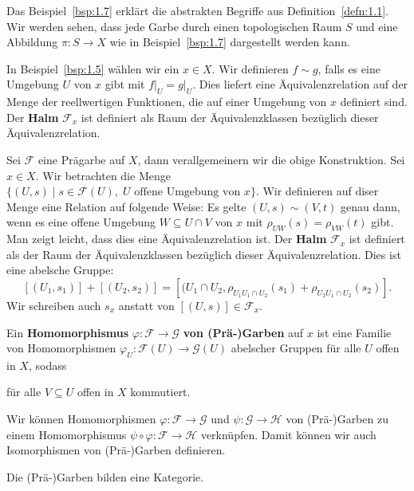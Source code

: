 \begin{bem}
	Das Beispiel~\ref{bsp:1.7} erklärt die abstrakten Begriffe aus Definition~\ref{defn:1.1}. Wir werden sehen, dass jede Garbe durch einen topologischen Raum $S$ und eine Abbildung $\pi:S \to X$ wie in Beispiel~\ref{bsp:1.7} dargestellt werden kann.
\end{bem}

\begin{bsp}
	In Beispiel~\ref{bsp:1.5} wählen wir ein $x \in X$. Wir definieren $f\sim g$, falls es eine Umgebung $U$ von $x$ gibt mit $f\vert_U = g\vert_U$. Dies liefert eine Äquivalenzrelation auf der Menge der reellwertigen Funktionen, die auf einer Umgebung von $x$ definiert sind. Der \textbf{Halm} $\mathcal{F}_x$ ist definiert als Raum der Äquivalenzklassen bezüglich dieser Äquivalenzrelation.
\end{bsp}

\begin{defn}
	Sei $\mathcal{F}$ eine Prägarbe auf $X$, dann verallgemeinern wir die obige Konstruktion. Sei $x \in X$. Wir betrachten die Menge $\{(U,s)\mid s \in \mathcal{F}(U),\; U \text{ offene Umgebung von } x\}$. Wir definieren auf diser Menge eine Relation auf folgende Weise: Es gelte	$(U,s) \sim (V,t)$ genau dann, wenn es eine offene Umgebung $W\subseteq U \cap V$ von $x$ mit $\rho_{UW}(s) = \rho_{VW}(t)$ gibt. Man zeigt leicht, dass dies eine Äquivalenzrelation ist. Der \textbf{Halm} $\mathcal{F}_x$ ist definiert als der Raum der Äquivalenzklassen bezüglich dieser Äquivalenzrelation. Dies ist eine abelsche Gruppe:
	\[
		[(U_1,s_1)] + [(U_2,s_2)] = [(U_1 \cap U_2, \rho_{U_1U_1\cap U_2}(s_1) + \rho_{U_2U_1\cap U_2}(s_2)].
	\]
	Wir schreiben auch $s_x$ anstatt von $[(U,s)] \in \mathcal{F}_x$.
\end{defn}

\begin{defn}
	Ein \textbf{Homomorphismus} $\varphi: \mathcal{F} \to \mathcal{G}$ \textbf{von (Prä-)Garben} auf $x$ ist eine Familie von Homomorphismen $\varphi_U:\mathcal{F}(U) \to \mathcal{G}(U)$ abelscher Gruppen für alle $U$ offen in $X$, sodass
	\begin{center}
	\end{center}
	für alle $V \subseteq U$ offen in $X$ kommutiert.

	Wir können Homomorphismen $\varphi:\mathcal{F}\to \mathcal{G}$ und $\psi:\mathcal{G} \to \mathcal{H}$ von (Prä-)Garben zu einem Homomorphismus $\psi\circ \varphi:\mathcal{F} \to \mathcal{H}$ verknüpfen. Damit können wir auch Isomorphismen von (Prä-)Garben definieren.

	Die (Prä-)Garben bilden eine Kategorie.
\end{defn}

